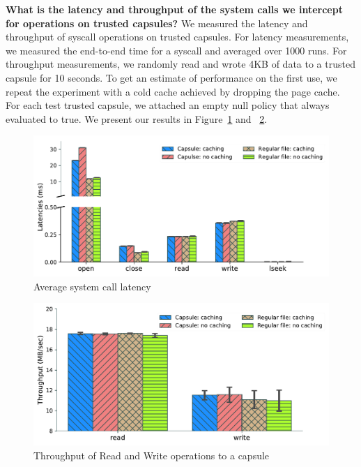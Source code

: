 \textbf{What is the latency and throughput of the system calls we
  intercept for operations on trusted capsules?} We measured the
latency and throughput of syscall operations on trusted capsules.  For
latency measurements, we measured the end-to-end time for a syscall
and averaged over 1000 runs.  For throughput measurements, we randomly
read and wrote 4KB of data to a trusted capsule for 10 seconds. To get an estimate of performance on the first use, we repeat the experiment with a cold cache achieved by dropping the page cache. 
For each test trusted capsule, we attached an empty null policy that always evaluated to true.  We present our results in Figure~\ref{fig:latencies} and ~\ref{fig:rw_throughput}.\\


\begin{figure}[h!]
  \includegraphics[width=15cm]{fig/latencies.pdf}
  \caption{Average system call latency}
  \label{fig:latencies}
\end{figure}

\begin{figure}[ht]
  \includegraphics[width=12cm]{fig/rw_throughput.pdf}
  \caption{Throughput of Read and Write operations to a capsule}
  \label{fig:rw_throughput}
\end{figure}


